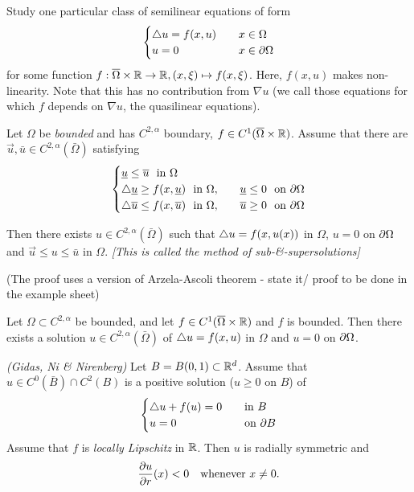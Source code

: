\documentclass[10pt,a4paper]{article}
\begin{document}
Study one particular class of semilinear equations of form
\begin{align*}
\begin{cases}
\triangle u = f(x,u)\quad & x\in \Omega \\
u=0 \quad & x\in \partial \Omega
\end{cases}
\end{align*}
for some function $f: \overline{\Omega} \times \mathbb{R} \rightarrow \mathbb{R}, (x,\xi) \mapsto f(x, \xi)$. Here, $f(x, u)$ makes non-linearity. Note that this has no contribution from $\nabla u$ (we call those equations for which $f$ depends on $\nabla u$, the quasilinear equations). 
\s

\thm Let $\Omega$ be \emph{bounded} and has $C^{2, \alpha}$ boundary, $f\in C^1(\overline{\Omega} \times \mathbb{R})$. Assume that there are $\vec{u}, \bar{u} \in C^{2, \alpha}(\bar{\Omega})$ satisfying
\begin{align*}
\begin{cases}
\underline{u} \leq \overline{u} \,\, \text{ in } \Omega \quad & {} \\
\triangle \underline{u} \geq f(x, \underline{u}) \,\, \text{ in }\Omega,\quad & \underline{u} \leq 0 \,\, \text{ on } \partial \Omega \\
\triangle \overline{u} \leq f(x,\overline{u}) \,\, \text{ in }\Omega, \quad & \overline{u} \geq 0 \,\,  \text{ on }\partial \Omega
\end{cases}
\end{align*}

Then there exists $u\in C^{2, \alpha}(\bar{\Omega})$ such that $\triangle u = f(x,u(x))$ in $\Omega$, $u=0$ on $\partial \Omega$ and $\vec{u}\leq u\leq \bar{u}$ in $\Omega$.
\emph{[This is called the method of sub-\&-supersolutions]}

(The proof uses a version  of Arzela-Ascoli theorem - state it/ proof to be done in the example sheet)
\s

\corr Let $\Omega \subset C^{2, \alpha}$ be bounded, and let $f\in C^1(\overline{\Omega} \times \mathbb{R})$ and $f$ is bounded. Then there exists a solution $u \in C^{2, \alpha}(\bar{\Omega})$ of $\triangle u = f(x, u)$ in $\Omega$ and $u=0$ on $\partial \Omega$.
\s

\thm \emph{(Gidas, Ni \& Nirenberg)} Let $B= B(0,1) \subset \mathbb{R}^d$. Assume that $u\in C^0(\bar{B})\cap C^2(B)$ is a positive solution ($u\geq 0$ on $B$) of
\begin{align*}
\begin{cases}
\triangle u + f(u) =0 \quad & \text{in }B\\
u = 0 \quad & \text{on }\partial B
\end{cases}
\end{align*}
Assume that $f$ is \emph{locally Lipschitz} in $\mathbb{R}$. Then $u$ is radially symmetric and 
\begin{align*}
\frac{\partial u}{\partial r}(x) < 0 \quad \text{whenever } x\neq 0.
\end{align*}
\end{document}
